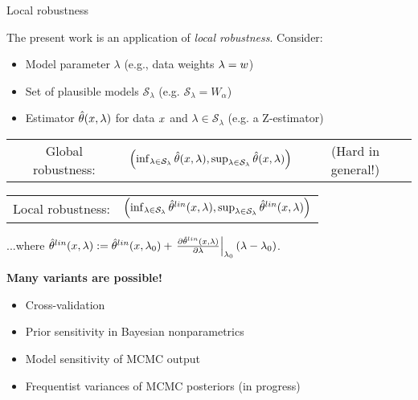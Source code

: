 \begin{frame}{Local robustness}

The present work is an application of {\em local robustness}.  Consider:
%
\begin{itemize}
%
\item Model parameter $\lambda$  (e.g., data weights $\lambda = w$)
\item Set of plausible models $\mathcal{S}_\lambda$
    (e.g. $\mathcal{S}_\lambda = W_\alpha$)
\item Estimator $\hat{\theta}(x, \lambda)$ for data $x$ and
    $\lambda \in \mathcal{S}_\lambda$
    (e.g. a Z-estimator)
%
\end{itemize}
%

\hrulefill

\begin{tabular}{ccc}
    Global robustness:   &
%
$
\left(
\inf_{\lambda \in \mathcal{S}_\lambda} \hat{\theta}(x, \lambda),
\sup_{\lambda \in \mathcal{S}_\lambda} \hat{\theta}(x, \lambda)
\right)
$
& (Hard in general!)
\end{tabular}


\hrulefill

\begin{tabular}{cc}
Local robustness:
&
$
\left(
\inf_{\lambda \in \mathcal{S}_\lambda} \hat{\theta}^{lin}(x, \lambda),
\sup_{\lambda \in \mathcal{S}_\lambda} \hat{\theta}^{lin}(x, \lambda)
\right)
$
%
\end{tabular}

...where $\hat{\theta}^{lin}(x, \lambda) :=
\hat{\theta}^{lin}(x, \lambda_0) +
    \left.\frac{\partial \hat{\theta}^{lin}(x, \lambda)}{\partial \lambda}\right|_{\lambda_0}
        (\lambda  - \lambda_0)$.

\hrulefill

\textbf{Many variants are possible!}

\begin{itemize}
    \item Cross-validation \citep{giordano2019swiss}
    \item Prior sensitivity in Bayesian nonparametrics \citep{giordano2021bnp}
    \item Model sensitivity of MCMC output \citep{giordano2018covariances}
    \item Frequentist variances of MCMC posteriors (in progress)
\end{itemize}


\end{frame}
